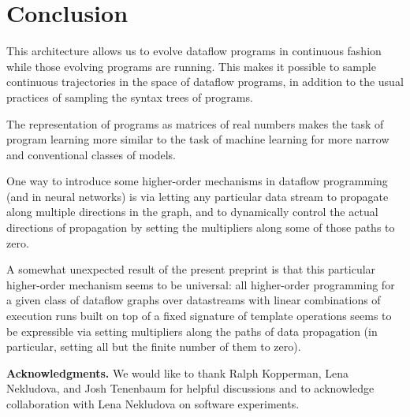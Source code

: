 \documentclass[withtimes]{easychair}
\begin{document}
\section{Conclusion}


This architecture allows us to evolve dataflow programs in continuous fashion while those evolving programs
are running. This makes it possible to sample continuous trajectories in the space of
dataflow programs, in addition to the usual practices of sampling the syntax trees of programs.

The representation of programs as matrices of real numbers makes the task of program
learning more similar to the task of machine learning for more narrow and conventional
classes of models.

One way to introduce some higher-order mechanisms in dataflow programming (and in neural
networks) is via letting any particular data stream to propagate along multiple directions in the
graph, and to dynamically control the actual directions of propagation by setting the
multipliers along some of those paths to zero.

A somewhat unexpected result of the present preprint is that this particular higher-order
mechanism seems to be universal: all higher-order programming for a given class
of dataflow graphs over datastreams with linear combinations of execution runs built on top of a fixed
signature of template operations seems to be expressible via setting multipliers
along the paths of data propagation (in particular, setting all but the finite number of them
to zero).

{\bf Acknowledgments.} We would like to thank Ralph Kopperman, Lena Nekludova, and Josh Tenenbaum for helpful discussions and
to acknowledge collaboration with Lena Nekludova on software experiments.

\label{sect:bib}


\end{document}
